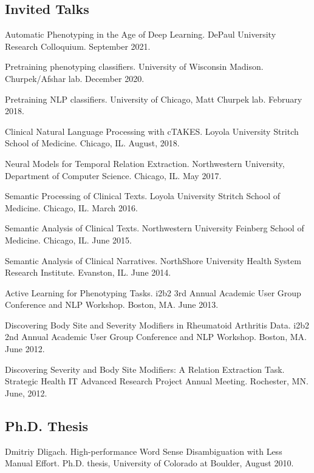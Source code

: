 \documentclass[letterpaper]{article}
\renewenvironment{itemize}{
  \begin{list}{}{
    \setlength{\leftmargin}{1.5em}
  }
}{
  \end{list}
}
\begin{document}
\subsection*{Invited Talks}
\begin{itemize}
\item Automatic Phenotyping in the Age of Deep Learning. DePaul University Research Colloquium. September 2021.
\item Pretraining phenotyping classifiers. University of Wisconsin Madison. Churpek/Afshar lab. December 2020.
\item Pretraining NLP classifiers. University of Chicago, Matt Churpek lab. February 2018.
\item Clinical Natural Language Processing with cTAKES. Loyola University Stritch School of Medicine. Chicago, IL. August, 2018.
\item Neural Models for Temporal Relation Extraction. Northwestern University, Department of Computer Science. Chicago, IL. May 2017.
\item Semantic Processing of Clinical Texts. Loyola University Stritch School of Medicine. Chicago, IL. March 2016.
\item Semantic Analysis of Clinical Texts. Northwestern University Feinberg School of Medicine. Chicago, IL. June 2015.
\item Semantic Analysis of Clinical Narratives. NorthShore University Health System Research Institute. Evanston, IL. June 2014.
\item Active Learning for Phenotyping Tasks. i2b2 3rd Annual Academic User Group Conference and NLP Workshop. Boston, MA. June 2013.
\item Discovering Body Site and Severity Modifiers in Rheumatoid Arthritis Data. i2b2 2nd Annual Academic User Group Conference and NLP Workshop. Boston, MA. June 2012.
\item Discovering Severity and Body Site Modifiers: A Relation Extraction Task. Strategic Health IT Advanced Research Project Annual Meeting. Rochester, MN. June, 2012.
\end{itemize}

\subsection*{Ph.D. Thesis}
\begin{itemize}
\item Dmitriy Dligach. High-performance Word Sense Disambiguation with Less Manual Effort. Ph.D. thesis, University of Colorado at Boulder, August 2010.
\end{itemize}
\end{document}

